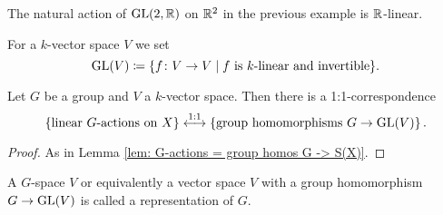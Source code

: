 \begin{expl}
 The natural action of $\operatorname{GL}(2,\mathbb{R})$ on $\mathbb{R}^2$ in the previous example is $\mathbb{R}$-linear.
\end{expl}


For a $k$-vector space $V$ we set
\[
 \operatorname{GL}(V) \coloneqq \{f \colon V \to V \mid f \text{ is $k$-linear and invertible}\}.
\]


\begin{lem}
 Let $G$ be a group and $V$ a $k$-vector space. Then there is a 1:1-correspondence
 \[
    \left\{\text{linear $G$-actions on $X$}\right\}
  \overset{1:1}{\longleftrightarrow}
  \left\{\text{group homomorphisms $G \to \operatorname{GL}(V)$}\right\}.
 \]
\end{lem}
\begin{proof}
 As in Lemma \ref{lem: G-actions = group homos G -> S(X)}.
\end{proof}


\begin{rem}
 A $G$-space $V$ or equivalently a vector space $V$ with a group homomorphism $G \to \operatorname{GL}(V)$ is called a representation of $G$.
\end{rem}


